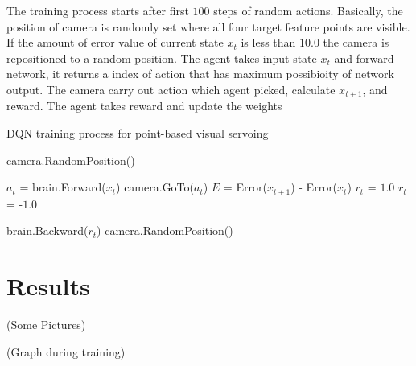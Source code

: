\documentclass[10pt]{article}
\begin{document}
The training process starts after first $100$ steps of random actions. Basically, the position of camera is randomly set where all four target feature points are visible. If the amount of error value of current state $x_t$ is less than $10.0$ the camera is repositioned to a random position. The agent takes input state $x_t$ and forward network, it returns a index of action that has maximum possibioity of network output. The camera carry out action which agent picked, calculate $x_{t+1}$, and reward. The agent takes reward and update the weights

 \begin{algorithm}
   \caption{DQN training process for point-based visual servoing}\label{euclid}
   \begin{algorithmic}[1]

     \State camera.RandomPosition()



     \State $a_t$ = brain.Forward($x_t$)
     \State camera.GoTo($a_t$)
     \State $E$ = Error($x_{t+1}$) - Error($x_t$)
     \State $r_t$ = $1.0$
     \Else
     \State $r_t$ = -$1.0$
     \EndIf

     brain.Backward($r_t$)
     camera.RandomPosition()
     \EndIf

     \EndFor

   \end{algorithmic}
 \end{algorithm}


\section{Results}
(Some Pictures)

(Graph during training)
\end{document}
